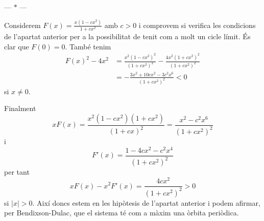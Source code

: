 \documentclass[12pt]{article}
\numberwithin{table}{section}
\numberwithin{equation}{section}
\numberwithin{figure}{section}
\newcommand{\abs}[1]{\lvert #1 \rvert}
\newcommand{\parbreak}{
	\begin{center}
		--- $\ast$ ---
	\end{center} 
}
\begin{document}
\parbreak

Considerem \( F(x) = \frac{x(1 - cx^2)}{1 + cx^2} \) amb \( c > 0 \) i comprovem si verifica les condicions de l'apartat anterior per a la possibilitat de tenit com a molt un cicle límit. És clar que \( F(0) = 0 \). També tenim 
\begin{align*}
    F(x)^2 - 4x^2 & = \frac{x^2(1 - cx^2)^2}{(1 + cx^2)^2} - \frac{4x^2(1 + cx^2)^2}{(1 + cx^2)^2} \\
    & = -\frac{3x^2 + 10cx^2 - 3c^2x^6}{(1 + cx^2)^2} < 0
\end{align*}
si \( x \neq 0 \). 

Finalment
\begin{equation*}
    xF(x) = \frac{x^2(1 - cx^2)(1 + cx^2)}{(1 + cx)^2} = \frac{x^2 - c^2x^6}{(1 + cx^2)^2}
\end{equation*}
i
\begin{equation*}
    F'(x) = \frac{1 - 4cx^2 - c^2x^4}{(1 + cx^2)^2}
\end{equation*}
per tant
\begin{equation*}
    xF(x) - x^2F'(x) = \frac{4cx^2}{(1 + cx^2)^2} > 0
\end{equation*}
si \( \abs{x} > 0 \). Així doncs estem en les hipòtesis de l'apartat anterior i podem afirmar, per Bendixson-Dulac, que el sistema té com a màxim una òrbita periòdica.
\end{document}
